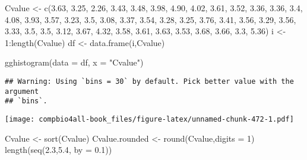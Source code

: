 \documentclass[
]{book}
\newenvironment{Shaded}{\begin{snugshade}}{\end{snugshade}}
\newcommand{\AttributeTok}[1]{\textcolor[rgb]{0.77,0.63,0.00}{#1}}
\newcommand{\DecValTok}[1]{\textcolor[rgb]{0.00,0.00,0.81}{#1}}
\newcommand{\FloatTok}[1]{\textcolor[rgb]{0.00,0.00,0.81}{#1}}
\newcommand{\FunctionTok}[1]{\textcolor[rgb]{0.00,0.00,0.00}{#1}}
\newcommand{\NormalTok}[1]{#1}
\newcommand{\OtherTok}[1]{\textcolor[rgb]{0.56,0.35,0.01}{#1}}
\newcommand{\SpecialCharTok}[1]{\textcolor[rgb]{0.00,0.00,0.00}{#1}}
\newcommand{\StringTok}[1]{\textcolor[rgb]{0.31,0.60,0.02}{#1}}
\begin{document}
\begin{Shaded}
\begin{Highlighting}[]
\NormalTok{Cvalue }\OtherTok{\textless{}{-}} \FunctionTok{c}\NormalTok{(}\FloatTok{3.63}\NormalTok{, }\FloatTok{3.25}\NormalTok{, }\FloatTok{2.26}\NormalTok{, }\FloatTok{3.43}\NormalTok{, }\FloatTok{3.48}\NormalTok{,}
  \FloatTok{3.98}\NormalTok{, }\FloatTok{4.90}\NormalTok{, }\FloatTok{4.02}\NormalTok{, }\FloatTok{3.61}\NormalTok{, }\FloatTok{3.52}\NormalTok{,}
  \FloatTok{3.36}\NormalTok{, }\FloatTok{3.36}\NormalTok{, }\FloatTok{3.4}\NormalTok{,  }\FloatTok{4.08}\NormalTok{, }\FloatTok{3.93}\NormalTok{,}
  \FloatTok{3.57}\NormalTok{, }\FloatTok{3.23}\NormalTok{, }\FloatTok{3.5}\NormalTok{,  }\FloatTok{3.08}\NormalTok{, }\FloatTok{3.37}\NormalTok{,}
  \FloatTok{3.54}\NormalTok{, }\FloatTok{3.28}\NormalTok{, }\FloatTok{3.25}\NormalTok{, }\FloatTok{3.76}\NormalTok{, }\FloatTok{3.41}\NormalTok{,}
  \FloatTok{3.56}\NormalTok{, }\FloatTok{3.29}\NormalTok{, }\FloatTok{3.56}\NormalTok{, }\FloatTok{3.33}\NormalTok{, }\FloatTok{3.5}\NormalTok{,}
  \FloatTok{3.5}\NormalTok{,  }\FloatTok{3.12}\NormalTok{, }\FloatTok{3.67}\NormalTok{, }\FloatTok{4.32}\NormalTok{, }\FloatTok{3.58}\NormalTok{,}
  \FloatTok{3.61}\NormalTok{, }\FloatTok{3.63}\NormalTok{, }\FloatTok{3.53}\NormalTok{, }\FloatTok{3.68}\NormalTok{, }\FloatTok{3.66}\NormalTok{,}
  \FloatTok{3.3}\NormalTok{, }\FloatTok{5.36}\NormalTok{)}
\NormalTok{i }\OtherTok{\textless{}{-}} \DecValTok{1}\SpecialCharTok{:}\FunctionTok{length}\NormalTok{(Cvalue)}
\NormalTok{df }\OtherTok{\textless{}{-}} \FunctionTok{data.frame}\NormalTok{(i,Cvalue)}

\FunctionTok{gghistogram}\NormalTok{(}\AttributeTok{data =}\NormalTok{ df, }\AttributeTok{x =} \StringTok{"Cvalue"}\NormalTok{)}
\end{Highlighting}
\end{Shaded}

\begin{verbatim}
## Warning: Using `bins = 30` by default. Pick better value with the argument
## `bins`.
\end{verbatim}

\texttt{[image: compbio4all-book\_files/figure-latex/unnamed-chunk-472-1.pdf]}

\begin{Shaded}
\begin{Highlighting}[]
\NormalTok{Cvalue }\OtherTok{\textless{}{-}} \FunctionTok{sort}\NormalTok{(Cvalue)}
\NormalTok{Cvalue.rounded }\OtherTok{\textless{}{-}} \FunctionTok{round}\NormalTok{(Cvalue,}\AttributeTok{digits =} \DecValTok{1}\NormalTok{)}
\FunctionTok{length}\NormalTok{(}\FunctionTok{seq}\NormalTok{(}\FloatTok{2.3}\NormalTok{,}\FloatTok{5.4}\NormalTok{, }\AttributeTok{by =} \FloatTok{0.1}\NormalTok{))}
\end{Highlighting}
\end{Shaded}
\end{document}

